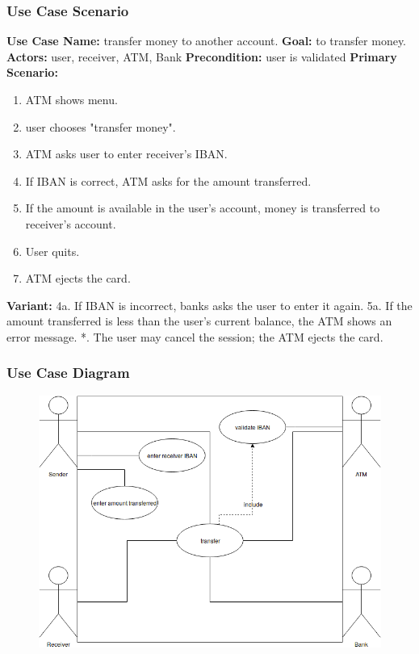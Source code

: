 \documentclass{article}
\begin{document}
		\subsubsection{Use Case Scenario}
		\textbf{Use Case Name:}	transfer money to another account.
		\newline\textbf{Goal:} to transfer money.
		\newline\textbf{Actors:} user, receiver, ATM, Bank 	
		\newline\textbf{Precondition:} user is validated 	
		\newline\textbf{Primary Scenario:}	
			\begin{enumerate}[label*=\arabic*.]
				\item ATM shows menu.
				\item user chooses "transfer money".
				\item ATM asks user to enter receiver's IBAN.
				\item If IBAN is correct, ATM asks for the amount transferred.
				\item If the amount is available in the user's account, money is transferred to receiver's account.
				\item User quits.
				\item ATM ejects the card.
			\end{enumerate}
		\textbf{Variant:}\newline	
			\hspace*{5mm}4a. If IBAN is incorrect, banks asks the user to enter it again.\newline
			\hspace*{5mm}5a. If the amount transferred is less than the user's current balance, the ATM shows an error message.\newline
			\hspace*{5mm}*. The user may cancel the session; the ATM ejects the card.

		\newpage\subsubsection{Use Case Diagram}
		\begin{figure}[h!]
		  \includegraphics[width=\linewidth]{img/transfer_usecase.png}
		\end{figure}
\end{document}
